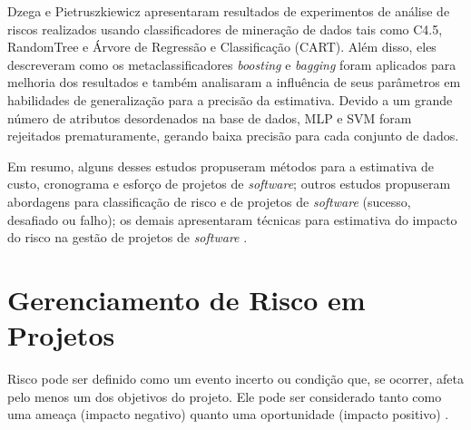 Dzega e Pietruszkiewicz \cite{dzega2010classification} apresentaram resultados de experimentos de análise de riscos realizados usando classificadores de mineração de dados tais como C4.5, RandomTree e Árvore de Regressão e Classificação (CART). Além disso, eles descreveram como os metaclassificadores \textit{boosting} e \textit{bagging} foram aplicados para melhoria dos resultados e também analisaram a influência de seus parâmetros em habilidades de generalização para a precisão da estimativa. Devido a um grande número de atributos desordenados na base de dados, MLP e SVM foram rejeitados prematuramente, gerando baixa precisão para cada conjunto de dados.

Em resumo, alguns desses estudos propuseram métodos para a estimativa de custo, cronograma e esforço de projetos de \textit{software}; outros estudos propuseram abordagens para classificação de risco e de projetos de \textit{software} (sucesso, desafiado ou falho); os demais apresentaram técnicas para estimativa do impacto do risco na gestão de projetos de \textit{software} \cite{yu2011software} \cite{saxena2012software} \cite{lazzerini2011analyzing} \cite{dzega2010classification}. 

\section{Gerenciamento de Risco em Projetos}

Risco pode ser definido como um evento incerto ou condição que, se ocorrer, afeta pelo menos um dos objetivos do projeto. Ele pode ser considerado tanto como uma ameaça (impacto negativo) quanto uma oportunidade (impacto positivo) \cite{PMBOK2008}. 

